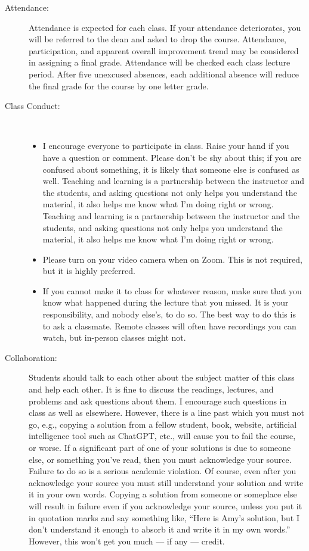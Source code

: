 \documentclass [letterpaper,11pt]{article}
\begin{document}
\begin{description}
\item[Attendance:]
Attendance is expected for each class. If your attendance deteriorates, you will be referred to the dean and asked to drop the course. Attendance, participation, and apparent overall improvement trend may be considered in assigning a final grade.
Attendance will be checked each class lecture period.  After five unexcused absences, each additional absence will reduce the final grade for the course by one letter grade.

\item[Class Conduct:] \
   \begin{itemize}\setlength{\itemsep}{0em}\setlength{\parskip}{0pt}
   	\item I encourage everyone to participate in class. Raise your hand if you have a question or
comment. Please don't be shy about this; if you are confused about something, it is likely
that someone else is confused as well. Teaching and learning is a partnership between
the instructor and the students, and asking questions not only helps you understand the
material, it also helps me know what I'm doing right or wrong.
		Teaching and learning is a partnership between the instructor and the students, and asking questions not only helps you understand the material, it also
		helps me know what I'm doing right or wrong.
	\item Please turn on your video camera when on Zoom.  This is not required, but it is highly preferred.
	\item  If you cannot make it to class for whatever reason, make sure that you know what
happened during the lecture that you missed. It is your responsibility, and nobody
else's, to do so. The best way to do this is to ask a classmate.  Remote classes will  often
have recordings you can watch, but in-person classes might not. 
	     
     \end{itemize}


\item[Collaboration:]
Students should talk to each other about the subject matter of this class and help each other.  It is fine to discuss the readings, lectures, and problems and ask questions about them. I encourage such questions in class as well as elsewhere. However, there is a line past which you must not go, e.g., copying a solution from a fellow student, book, website, artificial intelligence tool such as ChatGPT, etc., will cause you to fail the course, or worse. If a significant part of one of your solutions is due to someone else, or something you've read, then you must acknowledge your source. Failure to do so is a serious academic violation. Of course, even after you acknowledge your source you must still understand your solution and write it in your own words. Copying a solution from someone or someplace else will result in failure even if you acknowledge your source, unless you put it in quotation marks and say something like, ``Here is Amy's solution, but I don't understand it enough to absorb it and write it in my own words.'' However, this won't get you much --- if any --- credit. 


\end{description}
\end{document}
